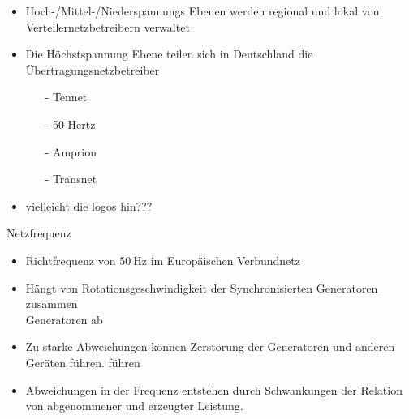 \documentclass[aspectratio=1610, professionalfonts, 9pt]{beamer}
\begin{document}
\begin{frame}
  \begin{itemize}
    \item Hoch-/Mittel-/Niederspannungs Ebenen
     werden regional und lokal von Verteilernetzbetreibern verwaltet
    \item Die Höchstspannung Ebene teilen sich in
    Deutschland die Übertragungsnetzbetreiber
    \begin{itemize}
      \item[-] Tennet
      \item[-] 50-Hertz
      \item[-] Amprion
      \item[-] Transnet
  \end{itemize}
\item vielleicht die logos hin???
\end{itemize}
\end{frame}

\begin{frame}{Netzfrequenz}
\begin{itemize}[<+->]
\item Richtfrequenz von $\SI{50}{\hertz}$ im Europäischen Verbundnetz
\item Hängt von Rotationsgeschwindigkeit der Synchronisierten Generatoren zusammen\\
Generatoren ab
\item Zu starke Abweichungen können Zerstörung der Generatoren und anderen Geräten führen.
führen
\item Abweichungen in der Frequenz entstehen durch Schwankungen
der Relation von abgenommener und erzeugter Leistung.
\end{itemize}
\end{frame}
\end{document}
